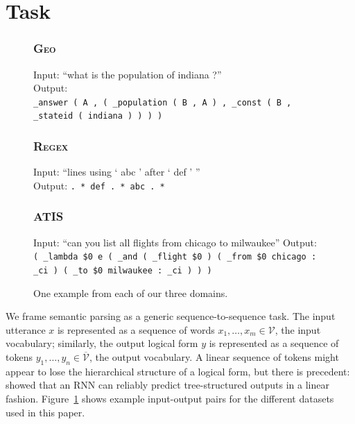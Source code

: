 \documentclass[11pt,letterpaper]{article}
\newcommand{\atis}{\textsc{ATIS}\xspace}
\newcommand{\regex}{\textsc{Regex}\xspace}
\newcommand{\geo}{\textsc{Geo}\xspace}
\newcommand{\vocabin}{\mathcal{V}}
\newcommand{\vocabout}{\overline{\mathcal{V}}}
\begin{document}
\section{Task}
\begin{figure}[t] 
\small
\begin{framed}
\footnotesize
\subsubsection*{\geo}
Input: ``what is the population of indiana ?''\\
Output: \\
\texttt{\_answer ( A , ( \_population ( B , A ) , \_const ( B , \_stateid ( indiana ) ) ) )}

\subsubsection*{\regex}
Input: ``lines using ` abc ' after ` def ' ''\\
Output: \texttt{. * def . * abc . *}

\subsubsection*{\atis}
Input: ``can you list all flights from chicago to milwaukee''
Output: \\
\texttt{( \_lambda \$0 e ( \_and ( \_flight \$0 ) ( \_from \$0 chicago : \_ci ) ( \_to \$0 milwaukee : \_ci ) ) )}
\end{framed}
\caption{One example from each of our three domains.}
\label{fig:task}
\end{figure}

We frame semantic parsing as a generic sequence-to-sequence task.
The input utterance $x$ is represented as a sequence of words $x_1, \dotsc, x_m
\in \vocabin$, the input vocabulary;
similarly, the output logical form $y$ is represented
as a sequence of tokens $y_1, \dotsc, y_n \in \vocabout$, the output vocabulary.
A linear sequence of tokens might appear to lose the hierarchical structure of a logical form,
but there is precedent: 
showed that an RNN can reliably predict tree-structured outputs
in a linear fashion.
Figure~\ref{fig:task} shows example input-output pairs for the different
datasets used in this paper.
\end{document}
